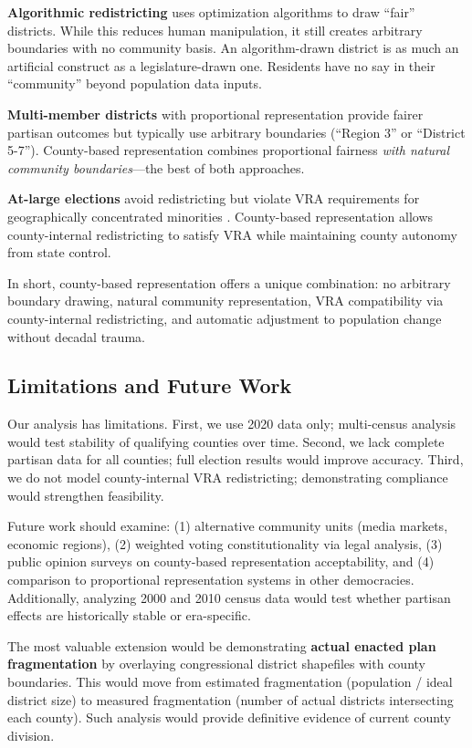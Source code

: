 \textbf{Algorithmic redistricting} \citep{duchin2018geometry, procaccia2021axioms} uses optimization algorithms to draw ``fair'' districts. While this reduces human manipulation, it still creates arbitrary boundaries with no community basis. An algorithm-drawn district is as much an artificial construct as a legislature-drawn one. Residents have no say in their ``community'' beyond population data inputs.

\textbf{Multi-member districts} with proportional representation \citep{amy2000behind} provide fairer partisan outcomes but typically use arbitrary boundaries (``Region 3'' or ``District 5-7''). County-based representation combines proportional fairness \emph{with natural community boundaries}---the best of both approaches.

\textbf{At-large elections} avoid redistricting but violate VRA requirements for geographically concentrated minorities \citep{thornburg1986gingles}. County-based representation allows county-internal redistricting to satisfy VRA while maintaining county autonomy from state control.

In short, county-based representation offers a unique combination: no arbitrary boundary drawing, natural community representation, VRA compatibility via county-internal redistricting, and automatic adjustment to population change without decadal trauma.

\subsection{Limitations and Future Work}

Our analysis has limitations. First, we use 2020 data only; multi-census analysis would test stability of qualifying counties over time. Second, we lack complete partisan data for all counties; full election results would improve accuracy. Third, we do not model county-internal VRA redistricting; demonstrating compliance would strengthen feasibility.

Future work should examine: (1) alternative community units (media markets, economic regions), (2) weighted voting constitutionality via legal analysis, (3) public opinion surveys on county-based representation acceptability, and (4) comparison to proportional representation systems in other democracies. Additionally, analyzing 2000 and 2010 census data would test whether partisan effects are historically stable or era-specific.

The most valuable extension would be demonstrating \textbf{actual enacted plan fragmentation} by overlaying congressional district shapefiles with county boundaries. This would move from estimated fragmentation (population / ideal district size) to measured fragmentation (number of actual districts intersecting each county). Such analysis would provide definitive evidence of current county division.
